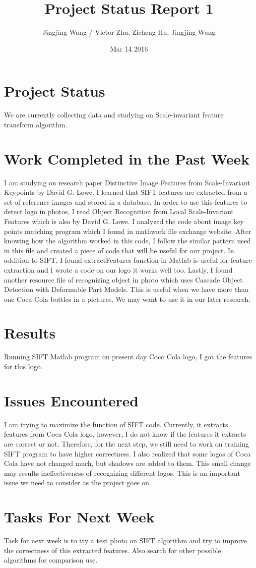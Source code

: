 \documentclass{article}
\begin{document}
   
\title{Project Status Report 1}
\author{Jingjing Wang / Victor Zhu, Zicheng Hu, Jingjing Wang}
\date{Mar 14 2016}
\maketitle


\section{Project Status}
We are currently collecting data and studying on Scale-invariant feature transform algorithm. 

\section{Work Completed in the Past Week}
I am studying on research paper Distinctive Image Features from Scale-Invariant Keypoints by David G. Lowe. I learned that SIFT features are extracted from a set of reference images and stored in a database. In order to use this features to detect logo in photos, I read Object Recognition from Local Scale-Invariant Features which is also by David G. Lowe. I analyzed the code about image key points matching program which I found in mathwork file exchange website. After knowing how the algorithm worked in this code, I follow the similar pattern used in this file and created a piece of code that will be useful for our project. In addition to SIFT, I found extractFeatures function in Matlab is useful for feature extraction and I wrote a code on our logo it works well too. Lastly, I found another resource file of recognizing object in photo which uses Cascade Object Detection with Deformable Part Models. This is useful when we have more than one Coca Cola bottles in a pictures. We may want to use it in our later research.

\section{Results}
Running SIFT Matlab program on present day Coco Cola logo, I got the features for this logo.

\section{Issues Encountered}
I am trying to maximize the function of SIFT code. Currently, it extracts features from Coca Cola logo, however, I do not know if the features it extracts are correct or not. Therefore, for the next step, we still need to work on training SIFT program to have higher correctness. I also realized that some logos of Coca Cola have not changed much, but shadows are added to them. This small change may results ineffectiveness of recognizing different logos. This is an important issue we need to consider as the project goes on.

\section{Tasks For Next Week}
Task for next week is to try a test photo on SIFT algorithm and try to improve the correctness of this extracted features. Also search for other possible algorithms for comparison use. 


 
\end{document}
